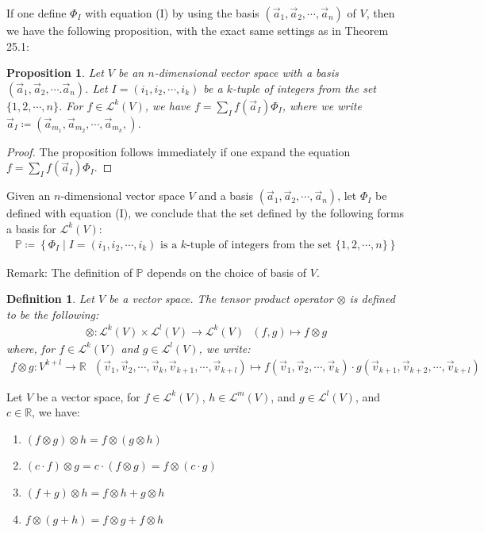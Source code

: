 \documentclass[11pt,oneside]{book}
\theoremstyle{break}
\theoremstyle{break}
\newtheorem{prop}[lem]{Proposition}
\newtheorem{defn}{Definition}[corL]
\newcommand{\R}{\mathbb{R}}
\newcommand{\Lt}{\mathcal{L}}
\newcommand{\remark}{\color{blue}Remark: \color{black}}
\begin{document}
If one define $\Phi_I$ with equation (I) by using the basis $(\vec{a}_1,\vec{a}_2,\cdots, \vec{a}_n)$ of $V$, then we have the following proposition, with the exact same settings as in Theorem 25.1:
\begin{prop}
Let $V$ be an $n$-dimensional vector space with a basis $(\vec{a}_1,\vec{a}_2,\cdots. \vec{a}_n)$. Let $I = (i_1,i_2,\cdots, i_k)$ be a $k$-tuple of integers from the set $\{1,2,\cdots, n\}$. For $f \in \Lt^k(V)$, we have $f = \sum_I f(\vec{a}_I) \Phi_I$, where we write $\vec{a}_I \coloneqq \left(\vec{a}_{m_1},\vec{a}_{m_2},\cdots, \vec{a}_{m_k},\right)$.
\end{prop}

\begin{proof}
The proposition follows immediately if one expand the equation $f = \sum_I f(\vec{a}_I) \Phi_I$.
\end{proof}

Given an $n$-dimensional vector space $V$ and a basis $(\vec{a}_1,\vec{a}_2,\cdots, \vec{a}_n)$, let $\Phi_I$ be defined with equation (I), we conclude that the set defined by the following forms a basis for $\Lt^k(V)$:
\begin{align*}
\mathbb{P} \coloneqq \left\{ \Phi_I \mid I = (i_1,i_2,\cdots, i_k) \text{ is a }k\text{-tuple of integers from the set } \{1,2,\cdots, n\} \right\}
\tag{P}
\end{align*}

\remark The definition of $\mathbb{P}$ depends on the choice of basis of $V$. 

\begin{defn}
Let $V$ be a vector space. The tensor product operator $\otimes$ is defined to be the following:
\begin{align*}
\otimes: \Lt^k(V)\times \Lt^l(V) \to \Lt^k(V) \ \ \ (f,g)\mapsto f\otimes g
\end{align*}
where, for $f\in \Lt^k(V)$ and $g \in \Lt^l(V)$, we write:
\begin{align*}
f\otimes g : V^{k+l} \to \R \ \ \ (\vec{v}_1,\vec{v}_2,\cdots, \vec{v}_k, \vec{v}_{k+1},\cdots, \vec{v}_{k+l})\mapsto f(\vec{v}_1,\vec{v}_2,\cdots, \vec{v}_k)\cdot g(\vec{v}_{k+1},\vec{v}_{k+2}, \cdots, \vec{v}_{k+l} )
\end{align*}
\end{defn}

Let $V$ be a vector space, for $f \in \Lt^k(V)$, $h \in \Lt^m(V)$, and $g \in \Lt^l(V)$, and $c \in \R$, we have:
\begin{enumerate}[topsep=3pt,itemsep=-1ex,partopsep=1ex,parsep=1ex]
\item $(f\otimes g) \otimes h = f\otimes (g\otimes h)$
\item $(c\cdot f) \otimes g = c\cdot (f\otimes g) = f\otimes (c\cdot g)$
\item $(f+g) \otimes h = f\otimes h + g\otimes h$
\item $f\otimes (g+h) = f\otimes g+ f\otimes h$\\
\end{enumerate}
\end{document}

